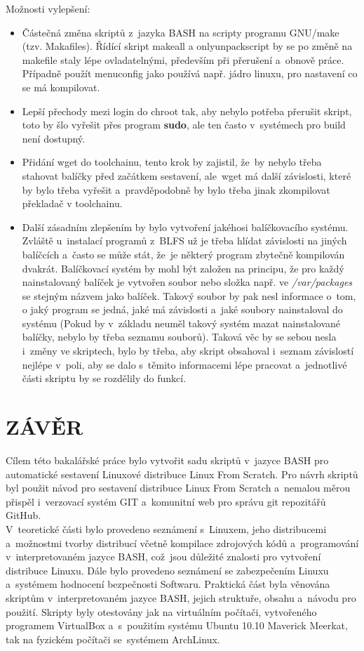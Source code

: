 \documentclass[a4paper,12pt]{article}
\newcommand{\nn}[1]{\clearpage\section*{\texorpdfstring{\uppercase{#1}}{#1}}\addcontentsline{toc}{section}{\uppercase{#1}}}%
\renewcommand{\b}[1]{\textbf{#1}} %
\begin{document}
Možnosti vylepšení:
\begin{itemize}
 \item Částečná změna skriptů z~jazyka BASH na scripty programu GNU/make (tzv. Makafiles). Řídící skript makeall a onlyunpackscript by se po změně na makefile staly lépe ovladatelnými, především při přerušení a~obnově práce. Případně použít menuconfig jako používá např. jádro linuxu, pro nastavení co se má kompilovat.
 \item Lepší přechody mezi login do chroot tak, aby nebylo potřeba přerušit skript, toto by šlo vyřešit přes program \b{sudo}, ale ten často v~systémech pro build není dostupný.
 \item Přidání wget do toolchainu, tento krok by zajistil, že~by nebylo třeba stahovat balíčky před začátkem sestavení, ale~wget má další závislosti, které by bylo třeba vyřešit a~pravděpodobně by bylo třeba jinak zkompilovat překladač v toolchainu.
 \item Další zásadním zlepšením by bylo vytvoření jakéhosi balíčkovacího systému. Zvláště u~instalací programů z~BLFS už je třeba hlídat závislosti na jiných balíčcích a~často se může stát, že~je některý program zbytečně kompilován dvakrát. Balíčkovací systém by mohl být založen na principu, že pro každý nainstalovaný balíček je vytvořen soubor nebo složka např. ve \textit{/var/packages} se stejným názvem jako balíček. Takový soubor by pak nesl informace o~tom, o jaký program se jedná, jaké má závislosti a~jaké soubory nainstaloval do systému (Pokud by v~základu neuměl takový systém mazat nainstalované balíčky, nebylo by třeba seznamu souborů). Taková věc by se sebou nesla i~změny ve skriptech, bylo by třeba, aby skript obsahoval i~seznam závislostí nejlépe v~poli, aby se dalo s~těmito informacemi lépe pracovat a~jednotlivé části skriptu by se rozdělily do funkcí.
\end{itemize}


\nn{Závěr}
Cílem této bakalářské práce bylo vytvořit sadu skriptů v~jazyce BASH pro automatické sestavení Linuxové distribuce Linux From Scratch. Pro návrh skriptů byl použit návod pro sestavení distribuce Linux From Scratch a~nemalou měrou přispěl i~verzovací systém GIT a~komunitní web pro správu git repozitářů GitHub.\\

V~teoretické části bylo provedeno seznámení s~Linuxem, jeho distribucemi a~možnostmi tvorby distribucí včetně kompilace zdrojových kódů a~programování v~interpretovaném jazyce BASH, což~jsou důležité znalosti pro vytvoření distribuce Linuxu. Dále bylo provedeno seznámení se zabezpečením Linuxu a~systémem hodnocení bezpečnosti Softwaru. Praktická část byla věnována skriptům v~interpretovaném jazyce BASH, jejich struktuře, obsahu a~návodu pro použití. Skripty byly otestovány jak na virtuálním počítači, vytvořeného programem VirtualBox a~s~použitím systému Ubuntu 10.10 Maverick Meerkat, tak na fyzickém počítači se~systémem ArchLinux.\\
\end{document}

